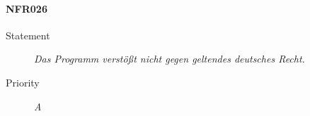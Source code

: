 \paragraph{NFR026}
\begin{description}
\item[Statement] \textit{Das Programm verstößt nicht gegen geltendes deutsches Recht.}
\item[Priority] \textit{A}
\end{description}
